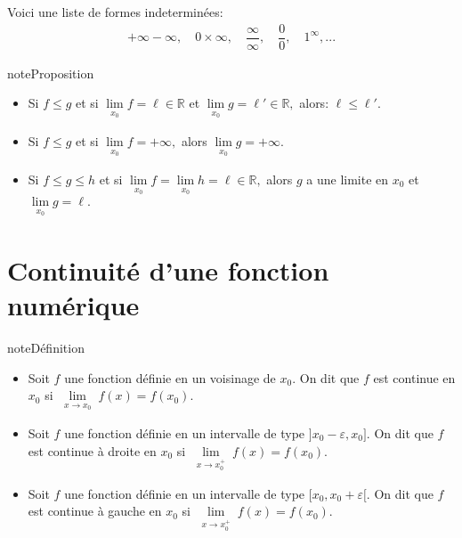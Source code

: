 \documentclass[letterpaper,10pt,french]{jupyterBook}
\begin{document}
\sphinxAtStartPar
Voici une liste de formes indeterminées:
\begin{equation*}
\begin{split}
+\infty-\infty,\quad0\times\infty,\quad\dfrac{\infty}{\infty},\quad\dfrac{0}{0},\quad 1^{\infty},...
\end{split}
\end{equation*}
\begin{sphinxadmonition}{note}{Proposition}
\begin{itemize}
\item {} 
\sphinxAtStartPar
Si \(f\leq g\) et si \(\lim\limits_{\substack{x_{0}}}f=\ell\in \mathbb{R}\) et \(\lim\limits_{\substack{x_{0}}}g=\ell'\in \mathbb{R},\) alors: \(\ell\leqslant\ell'.\)

\item {} 
\sphinxAtStartPar
Si \(f\leq g\) et si \(\lim\limits_{\substack{x_{0}}}f=+\infty,\) alors \(\lim\limits_{\substack{x_{0}}}g=+\infty.\)

\item {} 
\sphinxAtStartPar
Si \(f\leq g\leq h\) et si \(\lim\limits_{\substack{x_{0}}}f=\lim\limits_{\substack{x_{0}}}h=\ell\in \mathbb{R},\) alors \(g\) a une limite en \(x_0\) et \(\lim\limits_{\substack{x_{0}}}g=\ell.\)

\end{itemize}
\end{sphinxadmonition}


\section{Continuité d’une fonction numérique}
\label{\detokenize{limitefcts:continuite-d-une-fonction-numerique}}
\begin{sphinxadmonition}{note}{Définition}
\begin{itemize}
\item {} 
\sphinxAtStartPar
Soit \(f\) une fonction définie en un voisinage de \(x_0.\) On dit que \(f\) est continue en \(x_0\) si \(\lim\limits_{\substack{x\rightarrow x_{0}}}f(x)=f(x_0).\)

\item {} 
\sphinxAtStartPar
Soit \(f\) une fonction définie en un intervalle de type \(]x_0-\varepsilon, x_0].\) On dit que \(f\) est continue à droite en \(x_0\) si \(\lim\limits_{\substack{x\rightarrow x_{0}^{+}}}f(x)=f(x_0).\)

\item {} 
\sphinxAtStartPar
Soit \(f\) une fonction définie en un intervalle de type \([x_0,x_0+\varepsilon[.\) On dit que \(f\) est continue à gauche en \(x_0\) si \(\lim\limits_{\substack{x\rightarrow x_{0}^{+}}}f(x)=f(x_0).\)

\end{itemize}
\end{sphinxadmonition}
\end{document}
